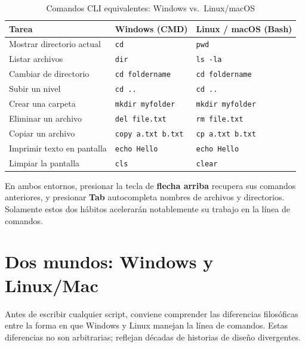 \begin{table}[h]
\centering
\caption{Comandos CLI equivalentes: Windows vs.\ Linux/macOS}
\label{tab:first-commands}
\begin{tabular}{@{}lll@{}}
\toprule
\textbf{Tarea} & \textbf{Windows (CMD)} & \textbf{Linux / macOS (Bash)} \\
\midrule
Mostrar directorio actual   & \texttt{cd}              & \texttt{pwd}             \\
Listar archivos             & \texttt{dir}             & \texttt{ls -la}          \\
Cambiar de directorio       & \texttt{cd foldername}   & \texttt{cd foldername}   \\
Subir un nivel              & \texttt{cd ..}           & \texttt{cd ..}           \\
Crear una carpeta           & \texttt{mkdir myfolder}  & \texttt{mkdir myfolder}  \\
Eliminar un archivo         & \texttt{del file.txt}    & \texttt{rm file.txt}     \\
Copiar un archivo           & \texttt{copy a.txt b.txt}& \texttt{cp a.txt b.txt}  \\
Imprimir texto en pantalla  & \texttt{echo Hello}      & \texttt{echo Hello}      \\
Limpiar la pantalla         & \texttt{cls}             & \texttt{clear}           \\
\bottomrule
\end{tabular}
\end{table}

\begin{tipbox}
En ambos entornos, presionar la tecla de \textbf{flecha arriba} recupera sus
comandos anteriores, y presionar \textbf{Tab} autocompleta nombres de
archivos y directorios. Solamente estos dos hábitos acelerarán
notablemente su trabajo en la línea de comandos.
\end{tipbox}

\section{Dos mundos: Windows y Linux/Mac}
\label{sec:two-worlds}

Antes de escribir cualquier script, conviene comprender las diferencias
filosóficas entre la forma en que Windows y Linux manejan la línea de
comandos. Estas diferencias no son arbitrarias; reflejan décadas de
historias de diseño divergentes.

